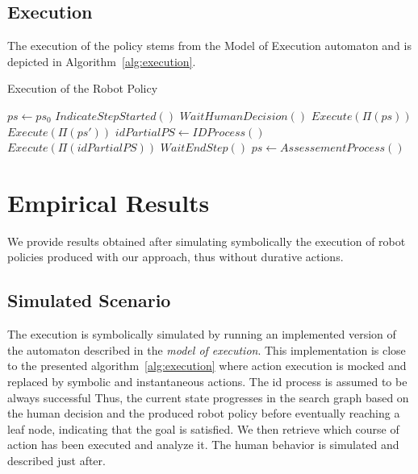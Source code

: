     \subsection{Execution}

The execution of the policy stems from the Model of Execution automaton and is depicted in Algorithm~\ref{alg:execution}.

\begin{algorithm}
\caption{Execution of the Robot Policy }\label{alg:execution}
\begin{algorithmic}[1]

\State $ps \gets ps_0$ 
    \State $IndicateStepStarted()$ 
    \State $WaitHumanDecision()$
     
        \State $Execute(\Pi(ps))$
    \Else
         
            \State $Execute(\Pi(ps'))$
        \Else
            \State $idPartialPS \gets IDProcess()$ 
            \State $Execute(\Pi(idPartialPS))$
        \EndIf
    \EndIf
    \State $WaitEndStep()$ 
    \State $ps \gets AssessementProcess()$ 
\EndWhile

\end{algorithmic}
\end{algorithm}

\section{Empirical Results}

We provide results obtained after simulating symbolically the execution of robot policies produced with our approach, thus without durative actions. 

    \subsection{Simulated Scenario}

The execution is symbolically simulated by running an implemented version of the automaton described in the \textit{model of execution}. This implementation is close to the presented algorithm~\ref{alg:execution} where action execution is mocked and replaced by symbolic and instantaneous actions. 
The \acrshort{id} process is assumed to be always successful
Thus, the current state progresses in the search graph based on the human decision and the produced robot policy before eventually reaching a leaf node, indicating that the goal is satisfied. 
We then retrieve which course of action has been executed and analyze it.
The human behavior is simulated and described just after. 


